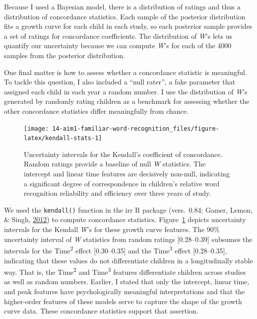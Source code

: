 \documentclass [11pt, proquest] {uwthesis}[2015/03/03]
\begin{document}
Because I used a Bayesian model, there is a distribution of ratings and
thus a distribution of concordance statistics. Each sample of the
posterior distribution fits a growth curve for each child in each study,
so each posterior sample provides a set of ratings for concordance
coefficients. The distribution of \emph{W}'s lets us quantify our
uncertainty because we can compute \emph{W}'s for each of the 4000
samples from the posterior distribution.

One final matter is how to assess whether a concordance statistic is
meaningful. To tackle this question, I also included a ``null rater'', a
fake parameter that assigned each child in each year a random number. I
use the distribution of \emph{W}'s generated by randomly rating children
as a benchmark for assessing whether the other concordance statistics
differ meaningfully from chance.







\begin{figure}
\texttt{[image: 14-aim1-familiar-word-recognition\_files/figure-latex/kendall-stats-1]} \caption{Uncertainty intervals for the Kendall's coefficient
of concordance. Random ratings provide a baseline of null \emph{W}
statistics. The intercept and linear time features are decisively
non-null, indicating a significant degree of correspondence in
children's relative word recognition reliability and efficiency over
three years of study.}\label{fig:kendall-stats}
\end{figure}
We used the \texttt{kendall()} function in the irr R package
(vers.~0.84; Gamer, Lemon, \& Singh, \protect\hyperlink{ref-irr}{2012})
to compute concordance statistics. Figure~\ref{fig:kendall-stats}
depicts uncertainty intervals for the Kendall \emph{W}'s for these
growth curve features. The 90\% uncertainty interval of \emph{W}
statistics from random ratings {[}0.28--0.39{]} subsumes the intervals
for the Time\textsuperscript{2} effect {[}0.30--0.35{]} and the
Time\textsuperscript{3} effect {[}0.28--0.35{]}, indicating that these
values do not differentiate children in a longitudinally stable way.
That is, the Time\textsuperscript{2} and Time\textsuperscript{3}
features differentiate children across studies as well as random
numbers. Earlier, I stated that only the intercept, linear time, and
peak features have psychologically meaningful interpretations and that
the higher-order features of these models serve to capture the shape of
the growth curve data. These concordance statistics support that
assertion.
\end{document}
